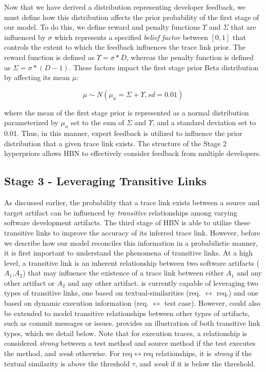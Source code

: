 Now that we have derived a distribution representing developer feedback, we must define how this distribution affects the prior probability of the first stage of our model. To do this, we define reward and penalty functions $\Upsilon$ and $\Sigma$ that are influenced by $\sigma$ which represents a specified \textit{belief factor} between $[0,1]$ that controls the extent to which the feedback influences the trace link prior. The reward function is defined as $\Upsilon = \sigma*D$, whereas the penalty function is defined as $\Sigma = \sigma*(D-1)$. These factors impact the first stage prior Beta distribution by affecting its mean $\mu$:

\begin{equation}\label{eq:mean-affect}
	\mu \sim N(\mu_n= \Sigma + \Upsilon, sd=0.01)
\end{equation}

\noindent where the mean of the first stage prior is represented as a normal distribution parameterized by $\mu_n$ set to the sum of $\Sigma$ and $\Upsilon$, and a standard deviation set to 0.01. Thus, in this manner, expert feedback is utilized to influence the prior distribution that a given trace link exists. The structure of the Stage 2 hyperpriors allows \Comets HBN to effectively consider feedback from multiple developers.

\subsection{Stage 3 - Leveraging Transitive Links}
\label{sub:model-comp3}

As discussed earlier, the probability that a trace link exists between a source and target artifact can be influenced by \textit{transitive} relationships among varying software development artifacts.  The third stage of \Comets HBN is able to utilize these transitive links to improve the accuracy of its inferred trace link. However, before we describe how our model reconciles this information in a probabilistic manner, it is first important to understand the phenomena of transitive links. At a high level, a transitive link is an inherent relationship between two software artifacts ($A_1$,$A_2$) that may influence the existence of a trace link between either $A_1$ and any other artifact or $A_2$ and any other artifact. \Comet is currently capable of leveraging two types of transitive links, one based on textual-similarities (req. $\leftrightarrow$ req.) and one based on dynamic execution information (req. $\leftrightarrow$ test case). However, \Comet could also be extended to model transitive relationships between other types of artifacts, such as commit messages or issues.  provides an illustration of both transitive link types, which we detail below. Note that for execution traces, a relationship is considered \textit{strong} between a test method and source method if the test executes the method, and \textit{weak} otherwise. For req$\leftrightarrow$req relationships, it is \textit{strong} if the textual similarity is above the threshold $\tau$, and \textit{weak} if it is below the threshold.

